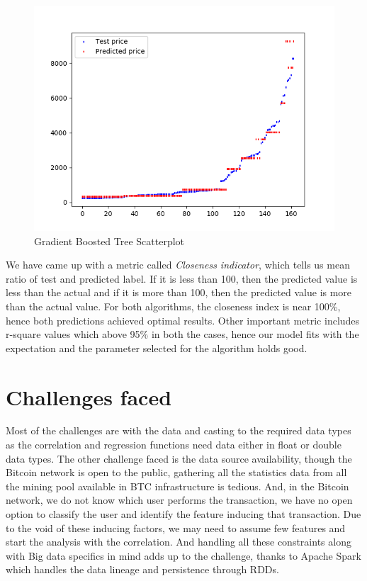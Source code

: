 \documentclass[sigconf]{acmart}
\begin{document}
\begin{figure}[!ht]
  \centering\includegraphics[width=\columnwidth]{images/GBTscatterplot.png}
  \caption{Gradient Boosted Tree Scatterplot}
  \label{scpl:gbt}
\end{figure}

We have came up with a metric called {\em Closeness indicator}, which tells us mean ratio of test and predicted label. If it is less than 100, then the predicted value is less than the actual and if it is more than 100, then the predicted value is more than the actual value.
For both algorithms, the closeness index is near 100\%, hence both predictions achieved optimal results. Other important metric includes r-square values which above 95\% in both the cases, hence our model fits with the expectation and the parameter selected for the algorithm holds good. 



\section{Challenges faced}
Most of the challenges are with the data and casting to the required data types as the correlation and regression functions need data either in float or double data types. The other challenge faced is the data source availability, though the Bitcoin network is open to the public, gathering all the statistics data from all the mining pool available in BTC infrastructure is tedious. And, in the Bitcoin network, we do not know which user performs the transaction, we have no open option to classify the user and identify the feature inducing that transaction. Due to the void of these inducing factors, we may need to assume few features and start the analysis with the correlation. And handling all these constraints along with Big data specifics in mind adds up to the challenge, thanks to Apache Spark which handles the data lineage and persistence through RDDs. 
\end{document}
